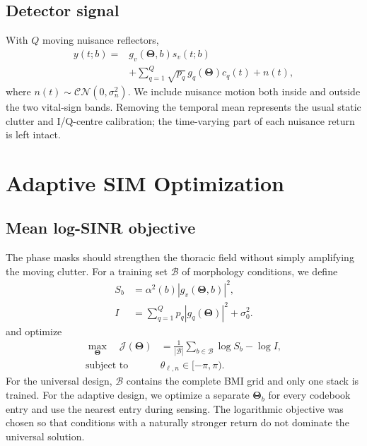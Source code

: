 \documentclass[pdflatex,sn-nature]{sn-jnl}
\newcommand{\vect}[1]{\bm{#1}}
\newcommand{\CN}{\mathcal{CN}}
\newcommand{\Jobj}{\mathcal{J}}
\begin{document}
\subsection{Detector signal}
With $Q$ moving nuisance reflectors,
\begin{equation}
\begin{aligned}
y(t;b)={}&g_v(\vect\Theta,b)s_v(t;b)\\
&+\sum_{q=1}^{Q}\sqrt{p_q}\,g_q(\vect\Theta)c_q(t)+n(t),
\end{aligned}
\label{eq:received}
\end{equation}
where $n(t)\sim\CN(0,\sigma_n^2)$. We include nuisance motion both inside and outside
the two vital-sign bands. Removing the temporal mean represents the usual static
clutter and I/Q-centre calibration; the time-varying part of each nuisance return is
left intact.

\section{Adaptive SIM Optimization}

\subsection{Mean log-SINR objective}
The phase masks should strengthen the thoracic field without simply amplifying the
moving clutter. For a training set $\mathcal B$ of morphology conditions, we define
\begin{equation}
\begin{aligned}
S_b&=\alpha^2(b)|g_v(\vect\Theta,b)|^2,\\
I&=\sum_{q=1}^{Q}p_q|g_q(\vect\Theta)|^2+\sigma_0^2.
\end{aligned}
\end{equation}
and optimize
\begin{equation}
\begin{aligned}
\max_{\vect\Theta}\quad
\Jobj(\vect\Theta)&=\frac{1}{|\mathcal B|}
\sum_{b\in\mathcal B}\log S_b-\log I,\\
\text{subject to}\quad&\theta_{\ell,n}\in[-\pi,\pi).
\end{aligned}
\label{eq:objective}
\end{equation}
For the universal design, $\mathcal B$ contains the complete BMI grid and only one
stack is trained. For the adaptive design, we optimize a separate
$\vect\Theta_b$ for every codebook entry and use the nearest entry during sensing.
The logarithmic objective was chosen so that conditions with a naturally stronger
return do not dominate the universal solution.
\end{document}
